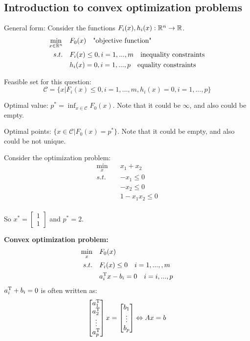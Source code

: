 
\subsection{Introduction to convex optimization problems}
General form: Consider the functions $F_i(x), h_i(x): \mathbb{R}^n\rightarrow \mathbb{R}$.
\begin{align*}
\min_{x\in \mathbb{R}^n} \quad &F_0(x) \quad \text{"objective function"}\\
s.t. \quad &F_i(x) \leq 0, i = 1,...,m \quad\text{inequality constraints}\\
&h_i(x) =0,i =1,...,p \quad \text{equality constraints}
\end{align*}


Feasible set for this question:
$$\mathcal{C} = \{x\vert F_i(x) \leq 0,i=1,...,m,h_i(x) = 0,i = 1,...,p \}$$


Optimal value: $p^* = \inf_{x\in \mathcal{C}}F_0(x)$. Note that it could be $\infty$, and also could be empty.

Optimal points: $\{x\in \mathcal{C}\vert F_0(x) = p^* \}$. Note that it could be empty, and also could be not unique.



\begin{example}
Consider the optimization problem:
\begin{align*}
\min_x \quad & x_1 + x_2 \\
s.t. 
&-x_1\leq 0\\
&-x_2\leq 0\\
&1- x_1 x_2\leq 0\\
\end{align*}

So $x^*=
\begin{bmatrix}
1\\
1
\end{bmatrix}$
and $p^* = 2$.

\end{example}


\vspace{0.5cm}
\textbf{Convex optimization problem: }
\begin{align*}
\min_x \quad &F_0(x) \\
s.t. \quad&F_i(x)\leq 0 \quad i = 1,...,,m\\
&a^{{\rm T}}_i x - b_i = 0 \quad i =i,...,p\\
\end{align*}
$a^{{\rm T}}_i + b_i = 0$ is often written as:
$$
\begin{bmatrix}
a_1^{{\rm T}}\\
a_2^{{\rm T}}\\
\vdots\\
a_p^{{\rm T}}
\end{bmatrix}x = 
\begin{bmatrix}
b_1\\
\vdots\\
b_p
\end{bmatrix}
\Leftrightarrow
Ax=b
$$

